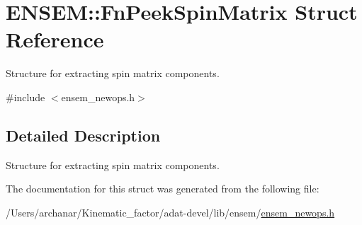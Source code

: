\hypertarget{structENSEM_1_1FnPeekSpinMatrix}{}\section{E\+N\+S\+EM\+:\+:Fn\+Peek\+Spin\+Matrix Struct Reference}
\label{structENSEM_1_1FnPeekSpinMatrix}


Structure for extracting spin matrix components.  




{\ttfamily \#include $<$ensem\+\_\+newops.\+h$>$}



\subsection{Detailed Description}
Structure for extracting spin matrix components. 

The documentation for this struct was generated from the following file\+:\begin{DoxyCompactItemize}
\item 
/\+Users/archanar/\+Kinematic\+\_\+factor/adat-\/devel/lib/ensem/\mbox{\hyperlink{adat-devel_2lib_2ensem_2ensem__newops_8h}{ensem\+\_\+newops.\+h}}\end{DoxyCompactItemize}
